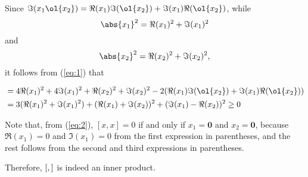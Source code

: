 \documentclass[11pt]{scrartcl}
\begin{document}
Since
$\Im(x_{1}\ol{x_2}) = \Re(x_1)\Im(\ol{x_2})+\Im(x_1)\Re(\ol{x_2})$,
while
\[\abs{x_1}^2 = \Re(x_1)^2 + \Im(x_1)^2\] and
\[\abs{x_2}^2 = \Re(x_2)^2 + \Im(x_2)^2,\]
it follows from (\ref{eq:1}) that

\begin{align}
  [x,x] & = 4\Re(x_1)^2 + 4\Im(x_1)^2 + \Re(x_2)^2 + \Im(x_2)^2 - 2 (\Re(x_1)\Im(\ol{x_2})+\Im(x_1)\Re(\ol{x_2})) \\
  \label{eq:2}
        & = 3(\Re(x_1)^2 + \Im(x_1)^2) + (\Re(x_1) + \Im(x_2))^2 +(\Im(x_1)-\Re(x_2))^{2} \geq 0
\end{align}

Note that, from (\ref{eq:2}), $[x, x] = 0$ if and only if
$x_1 = \bm{0}$ and $x_2= \bm{0}$, because $\Re(x_1) = 0$ and
$\Im(x_1) = 0$ from the first expression in parentheses, and the rest
follows from the second and third expressions in parentheses.

Therefore, $[\*, \*]$ is indeed an inner product.
\end{document}
